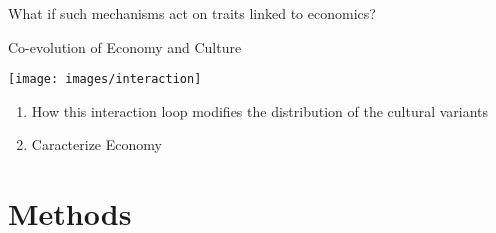 \documentclass[12pt, notes=show]{beamer}
\begin{document}
\begin{frame}
	\begin{center}
	    What if such mechanisms act on traits linked to economics?
	\end{center}
	\begin{center}
	\end{center}
\end{frame}

%
\begin{frame}{Co-evolution of Economy and Culture}

    \begin{center}
	\texttt{[image: images/interaction]}	
    \end{center}

\end{frame}

\begin{frame}
    \begin{enumerate}
	\item How this interaction loop modifies the distribution of the cultural variants
	\item Caracterize Economy
    \end{enumerate}

\end{frame}


\section{Methods}
\end{document}
